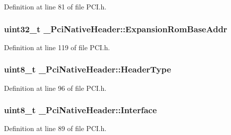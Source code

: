 Definition at line 81 of file P\+C\+I.\+h.

\subsubsection[{\texorpdfstring{Expansion\+Rom\+Base\+Addr}{ExpansionRomBaseAddr}}]{\setlength{\rightskip}{0pt plus 5cm}uint32\+\_\+t \+\_\+\+Pci\+Native\+Header\+::\+Expansion\+Rom\+Base\+Addr}\hypertarget{struct__PciNativeHeader_aed3842654fc63d6948453582c90c7897}{}\label{struct__PciNativeHeader_aed3842654fc63d6948453582c90c7897}


Definition at line 119 of file P\+C\+I.\+h.

\subsubsection[{\texorpdfstring{Header\+Type}{HeaderType}}]{\setlength{\rightskip}{0pt plus 5cm}uint8\+\_\+t \+\_\+\+Pci\+Native\+Header\+::\+Header\+Type}\hypertarget{struct__PciNativeHeader_a3eadff3dde49511e8771e19769964e23}{}\label{struct__PciNativeHeader_a3eadff3dde49511e8771e19769964e23}


Definition at line 96 of file P\+C\+I.\+h.

\subsubsection[{\texorpdfstring{Interface}{Interface}}]{\setlength{\rightskip}{0pt plus 5cm}uint8\+\_\+t \+\_\+\+Pci\+Native\+Header\+::\+Interface}\hypertarget{struct__PciNativeHeader_ada9dcea6b70e8eb30bfc652af3e90cb1}{}\label{struct__PciNativeHeader_ada9dcea6b70e8eb30bfc652af3e90cb1}


Definition at line 89 of file P\+C\+I.\+h.

